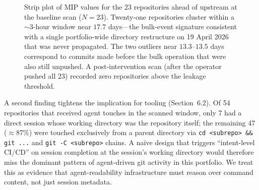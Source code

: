 \documentclass[12pt]{article}
\begin{document}
\begin{figure}[ht]
\centering
\caption{Strip plot of MIP values for the 23 repositories ahead of upstream at the baseline scan ($N=23$). Twenty-one repositories cluster within a $\sim$3-hour window near $17.7$ days---the bulk-event signature consistent with a single portfolio-wide directory restructure on 19 April 2026 that was never propagated. The two outliers near $13.3$--$13.5$ days correspond to commits made before the bulk operation that were also still unpushed. A post-intervention scan (after the operator pushed all 23) recorded zero repositories above the leakage threshold.}
\label{fig:mip-stripplot}
\end{figure}

A second finding tightens the implication for tooling (Section~6.2). Of 54 repositories that received agent touches in the scanned window, only 7 had a direct session whose working directory was the repository itself; the remaining 47 ($\approx$87\%) were touched exclusively from a parent directory via \texttt{cd <subrepo> \&\& git ...} and \texttt{git -C <subrepo>} chains. A na\"ive design that triggers ``intent-level CI/CD'' on session completion at the session's working directory would therefore miss the dominant pattern of agent-driven git activity in this portfolio. We treat this as evidence that agent-readability infrastructure must reason over command content, not just session metadata.
\end{document}
